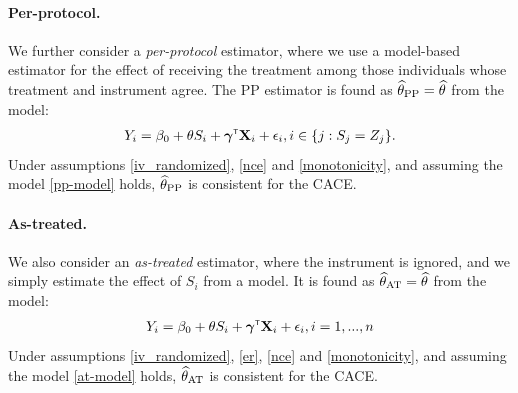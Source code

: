 \documentclass{article}
\def\spp{_{\text{PP}}}
\def\sat{_{\text{AT}}}
\begin{document}
\paragraph{Per-protocol.} We further consider a \textit{per-protocol} estimator, where we use a model-based estimator for the effect of receiving the treatment among those individuals whose treatment and instrument agree. The PP estimator is found as $\thetahat\spp = \thetahat$ from the model:
\begin{align}
    Y_i = \beta_0 + \theta S_i + \boldsymbol{\gamma}^{{\sf \scriptscriptstyle{T}}}{\bf X}_i + \epsilon_i, i \in \{j : S_j = Z_j\}.\label{pp-model}
\end{align}
Under assumptions \ref{iv_randomized}, \ref{nce} and \ref{monotonicity}, and assuming the model \eqref{pp-model} holds, $\thetahat\spp$ is consistent for the CACE. 

\paragraph{As-treated.} We also consider an \textit{as-treated} estimator, where the instrument is ignored, and we simply estimate the effect of $S_i$ from a model. It is found as $\thetahat\sat = \thetahat$ from the model:
\begin{align}
    Y_i = \beta_0 + \theta S_i + \boldsymbol{\gamma}^{{\sf \scriptscriptstyle{T}}}{\bf X}_i + \epsilon_i, i = 1, ..., n \label{at-model}
\end{align}
Under assumptions \ref{iv_randomized}, \ref{er}, \ref{nce} and \ref{monotonicity}, and assuming the model \eqref{at-model} holds, $\thetahat\sat$ is consistent for the CACE.
\end{document}
